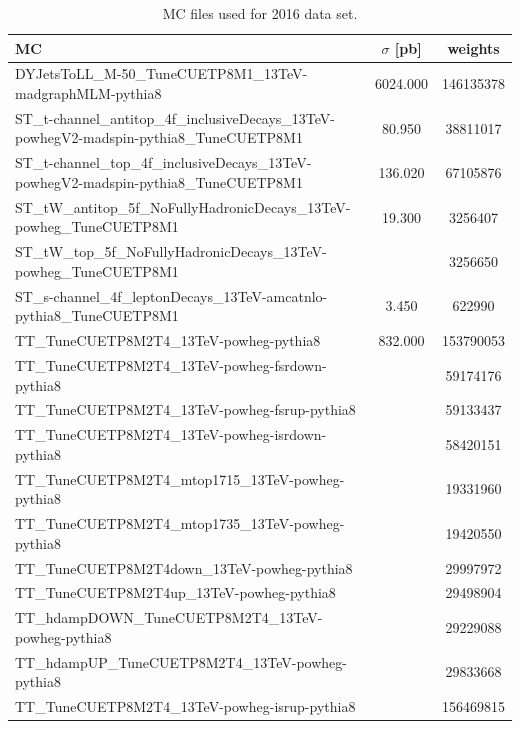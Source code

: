 \begin{table}[]
\begin{center}
\begin{tabular}{ l | c | c }
MC & $\sigma$ [pb] & weights \\\hline
\hline\tiny DYJetsToLL\_M-50\_TuneCUETP8M1\_13TeV-madgraphMLM-pythia8 & 6024.000 & 146135378\\
\hline\tiny ST\_t-channel\_antitop\_4f\_inclusiveDecays\_13TeV-powhegV2-madspin-pythia8\_TuneCUETP8M1 & 80.950 & 38811017\\
\hline\tiny ST\_t-channel\_top\_4f\_inclusiveDecays\_13TeV-powhegV2-madspin-pythia8\_TuneCUETP8M1 & 136.020 & 67105876\\
\hline\tiny ST\_tW\_antitop\_5f\_NoFullyHadronicDecays\_13TeV-powheg\_TuneCUETP8M1 & 19.300 & 3256407\\
\tiny ST\_tW\_top\_5f\_NoFullyHadronicDecays\_13TeV-powheg\_TuneCUETP8M1 &   & 3256650\\
\hline\tiny ST\_s-channel\_4f\_leptonDecays\_13TeV-amcatnlo-pythia8\_TuneCUETP8M1 & 3.450 & 622990\\
\hline\tiny TT\_TuneCUETP8M2T4\_13TeV-powheg-pythia8 & 832.000 & 153790053\\
\tiny TT\_TuneCUETP8M2T4\_13TeV-powheg-fsrdown-pythia8 &   & 59174176\\
\tiny TT\_TuneCUETP8M2T4\_13TeV-powheg-fsrup-pythia8 &   & 59133437\\
\tiny TT\_TuneCUETP8M2T4\_13TeV-powheg-isrdown-pythia8 &   & 58420151\\
\tiny TT\_TuneCUETP8M2T4\_mtop1715\_13TeV-powheg-pythia8 &   & 19331960\\
\tiny TT\_TuneCUETP8M2T4\_mtop1735\_13TeV-powheg-pythia8 &   & 19420550\\
\tiny TT\_TuneCUETP8M2T4down\_13TeV-powheg-pythia8 &   & 29997972\\
\tiny TT\_TuneCUETP8M2T4up\_13TeV-powheg-pythia8 &   & 29498904\\
\tiny TT\_hdampDOWN\_TuneCUETP8M2T4\_13TeV-powheg-pythia8 &   & 29229088\\
\tiny TT\_hdampUP\_TuneCUETP8M2T4\_13TeV-powheg-pythia8 &   & 29833668\\
\tiny TT\_TuneCUETP8M2T4\_13TeV-powheg-isrup-pythia8 &   & 156469815\\
\end{tabular}
\end{center}

\caption{MC files used for 2016 data set.}
    \label{tab:2016MC}
\end{table}

